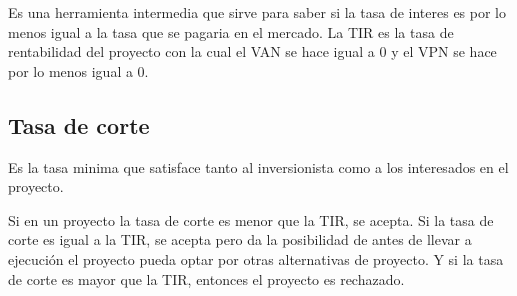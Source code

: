 \documentclass[a4paper, 11pt, oneside]{article}
\begin{document}
Es una herramienta intermedia que sirve para saber si la tasa de interes es por lo menos igual a la tasa que se pagaria en el mercado. La TIR es la tasa de rentabilidad del proyecto con la cual el VAN se hace igual a 0 y el VPN se hace por lo menos igual a 0.

\subsection{Tasa de corte}

Es la tasa minima que satisface tanto al inversionista como a los interesados en el proyecto.

Si en un proyecto la tasa de corte es menor que la TIR, se acepta. Si la tasa de corte es igual a la TIR, se acepta pero da la posibilidad de antes de llevar a ejecución el proyecto pueda optar por otras alternativas de proyecto. Y si la tasa de corte es mayor que la TIR, entonces el proyecto es rechazado.
\end{document}
